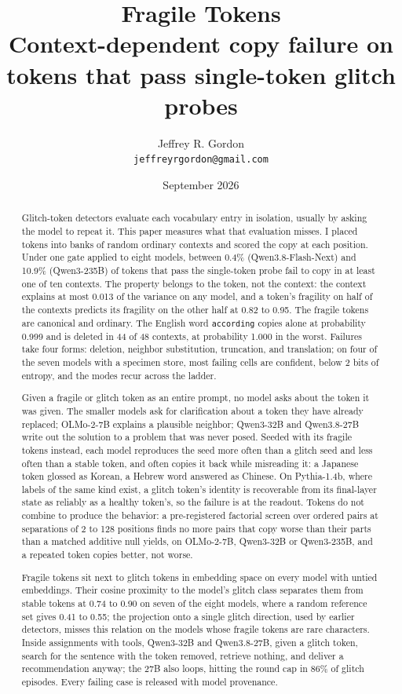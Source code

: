 \documentclass[11pt]{article}
\title{\Large\textbf{Fragile Tokens}\\[6pt]\large Context-dependent copy failure on tokens that pass single-token glitch probes}
\author{Jeffrey R. Gordon\\ \normalsize\texttt{jeffreyrgordon@gmail.com}}
\date{September 2026}
\begin{document}
\maketitle
\begin{abstract}
Glitch-token detectors evaluate each vocabulary entry in isolation, usually by asking the model to repeat it. This paper measures what that evaluation misses. I placed tokens into banks of random ordinary contexts and scored the copy at each position. Under one gate applied to eight models, between 0.4\% (Qwen3.8-Flash-Next) and 10.9\% (Qwen3-235B) of tokens that pass the single-token probe fail to copy in at least one of ten contexts. The property belongs to the token, not the context: the context explains at most 0.013 of the variance on any model, and a token's fragility on half of the contexts predicts its fragility on the other half at 0.82 to 0.95. The fragile tokens are canonical and ordinary. The English word \texttt{according} copies alone at probability 0.999 and is deleted in 44 of 48 contexts, at probability 1.000 in the worst. Failures take four forms: deletion, neighbor substitution, truncation, and translation; on four of the seven models with a specimen store, most failing cells are confident, below 2 bits of entropy, and the modes recur across the ladder.

Given a fragile or glitch token as an entire prompt, no model asks about the token it was given. The smaller models ask for clarification about a token they have already replaced; OLMo-2-7B explains a plausible neighbor; Qwen3-32B and Qwen3.8-27B write out the solution to a problem that was never posed. Seeded with its fragile tokens instead, each model reproduces the seed more often than a glitch seed and less often than a stable token, and often copies it back while misreading it: a Japanese token glossed as Korean, a Hebrew word answered as Chinese. On Pythia-1.4b, where labels of the same kind exist, a glitch token's identity is recoverable from its final-layer state as reliably as a healthy token's, so the failure is at the readout. Tokens do not combine to produce the behavior: a pre-registered factorial screen over ordered pairs at separations of 2 to 128 positions finds no more pairs that copy worse than their parts than a matched additive null yields, on OLMo-2-7B, Qwen3-32B or Qwen3-235B, and a repeated token copies better, not worse.

Fragile tokens sit next to glitch tokens in embedding space on every model with untied embeddings. Their cosine proximity to the model's glitch class separates them from stable tokens at 0.74 to 0.90 on seven of the eight models, where a random reference set gives 0.41 to 0.55; the projection onto a single glitch direction, used by earlier detectors, misses this relation on the models whose fragile tokens are rare characters. Inside assignments with tools, Qwen3-32B and Qwen3.8-27B, given a glitch token, search for the sentence with the token removed, retrieve nothing, and deliver a recommendation anyway; the 27B also loops, hitting the round cap in 86\% of glitch episodes. Every failing case is released with model provenance.
\end{abstract}
\end{document}
